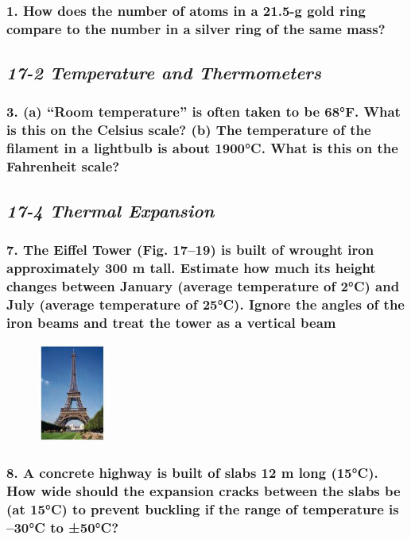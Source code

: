 \documentclass{article}
\begin{document}
\subsubsection*{
    1. How does the number of atoms in a 21.5-g gold ring compare to
    the number in a silver ring of the same mass? 
}
\begin{center}
    \subsection*{\textbf{\textit{17-2 Temperature and Thermometers}}}
\end{center}
\subsubsection*{
    3. (a) “Room temperature” is often taken to be 68°F. What is this
    on the Celsius scale? (b) The temperature of the filament in a lightbulb
    is about 1900°C. What is this on the Fahrenheit scale?
}
\begin{center}
    \subsection*{\textbf{\textit{17-4 Thermal Expansion}}}
\end{center}
\subsubsection*{
    7. The Eiffel Tower (Fig. 17–19) is built of wrought iron approximately 300 m
       tall. Estimate how much its height changes between January (average 
       temperature of 2°C) and July (average temperature of 25°C). Ignore the
       angles of the iron beams and treat the tower as a vertical beam
}
\begin{figure}[h]
    \begin{center}
        \includegraphics[width=0.2\textwidth]{figures/p7.jpg}
    \end{center}
\end{figure}
\subsubsection*{
    8. A concrete highway is built of slabs 12 m long (15°C). How wide should
    the expansion cracks between the slabs be (at 15°C) to prevent buckling if
    the range of temperature is –30°C to ±50°C?
}
\end{document}
